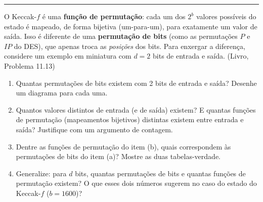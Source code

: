 \documentclass[11pt,a4paper]{article}
\newcommand{\livro}[1]{{\footnotesize\color{black!50}(Livro, Problema #1)}}
\newcommand{\exercicio}[1]{%
    \Needspace{8\baselineskip}%
    \par\vspace{1.2em}
    \noindent
    {\color{black!55}\rule[-0.25em]{3pt}{1.6em}}%
    \hspace{0.6em}{\Large\bfseries Exerc\'{i}cio #1}
    \par\vspace{-0.4em}
    \noindent{\color{black!35}\rule{\textwidth}{0.4pt}}
    \par\vspace{0.35em}
}
\begin{document}
\exercicio{5}
O Keccak-$f$ \'{e} uma \textbf{fun\c{c}\~{a}o de permuta\c{c}\~{a}o}: cada um dos $2^{b}$ valores poss\'{i}veis do estado \'{e} mapeado, de forma bijetiva (um-para-um), para exatamente um valor de sa\'{i}da. Isso \'{e} diferente de uma \textbf{permuta\c{c}\~{a}o de bits} (como as permuta\c{c}\~{o}es $P$ e $IP$ do DES), que apenas troca as \emph{posi\c{c}\~{o}es} dos bits. Para enxergar a diferen\c{c}a, considere um exemplo em miniatura com $d = 2$ bits de entrada e sa\'{i}da. \livro{11.13}
\begin{enumerate}[label=(\alph*)]
    \item Quantas permuta\c{c}\~{o}es de bits existem com 2 bits de entrada e sa\'{i}da? Desenhe um diagrama para cada uma.
    \item Quantos valores distintos de entrada (e de sa\'{i}da) existem? E quantas fun\c{c}\~{o}es de permuta\c{c}\~{a}o (mapeamentos bijetivos) distintas existem entre entrada e sa\'{i}da? Justifique com um argumento de contagem.
    \item Dentre as fun\c{c}\~{o}es de permuta\c{c}\~{a}o do item (b), quais correspondem \`{a}s permuta\c{c}\~{o}es de bits do item (a)? Mostre as duas tabelas-verdade.
    \item Generalize: para $d$ bits, quantas permuta\c{c}\~{o}es de bits e quantas fun\c{c}\~{o}es de permuta\c{c}\~{a}o existem? O que esses dois n\'{u}meros sugerem no caso do estado do Keccak-$f$ ($b = 1600$)?
\end{enumerate}
\end{document}

